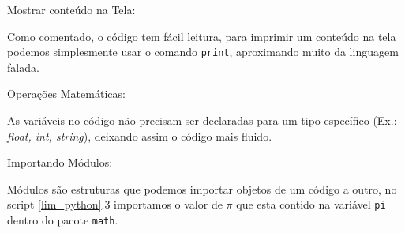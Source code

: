             Mostrar conteúdo na Tela:
            
            Como comentado, o código tem fácil leitura, para imprimir um conteúdo na tela 
            podemos simplesmente usar o comando \verb|print|, aproximando muito da linguagem falada.  
            \begin{quote}
                                                       

            \end{quote}
            
            Operações Matemáticas:
            
            As variáveis no código não precisam ser declaradas para um 
            tipo específico (Ex.: \textit{float, int, string}), deixando assim o código mais fluido. 
            \begin{quote}
            
                                                       
            \end{quote}
            
            Importando Módulos:
            
            Módulos são estruturas que podemos importar objetos de um código a outro,
            no script \ref{lim_python}.3 importamos o valor de $\pi$ que esta contido na variável \verb|pi| dentro do pacote \verb|math|. 
            
